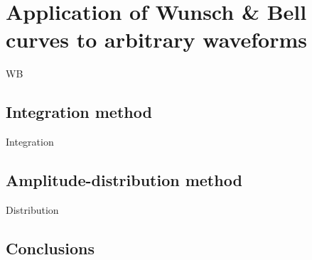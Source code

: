 \section{Application of Wunsch & Bell curves to arbitrary waveforms}
\label{sec:wb_for_arbitrary_wvfs}

WB



\subsection{Integration method}

Integration



\subsection{Amplitude-distribution method}

Distribution



%

\subsection{Conclusions}


